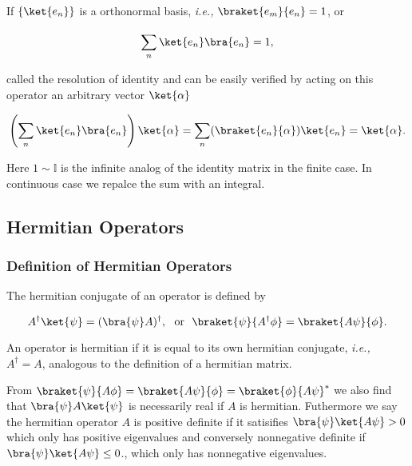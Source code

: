 \documentclass[a4paper,12pt]{report}
\begin{document}
If \(\{\ket{e_{n} }\} \) is a orthonormal basis, \textit{i.e.,} \(\braket{e_{m} }{e_{n} } = 1\), or 

\begin{equation}
  \sum_{n}^{} \ket{e_{n} }\bra{e_{n} } = 1,   
\end{equation}

called the resolution of identity and can be easily verified by acting on this operator an arbitrary vector \(\ket{\alpha } \)

\begin{equation}
  \left( \sum_{n}^{} \ket{e_{n} }\bra{e_{n} } \right) \ket{\alpha } = \sum_{n}^{} (\braket{e_{n} }{\alpha } )\ket{e_{n} } = \ket{\alpha }.   
\end{equation}

Here \(1 \sim  \mathbb{I}\) is the infinite analog of the identity matrix in the finite case. In continuous case we repalce the sum with an integral.





\subsection{Hermitian Operators}

\subsubsection{Definition of Hermitian Operators}

The hermitian conjugate of an operator is defined by 

\begin{equation}
  A^{\dagger} \ket{\psi } = (\bra{\psi }A )^{\dagger}, ~\text { or }~ \braket{\psi }{A^{\dagger} \phi } = \braket{A \psi }{\phi }. \label{herm2} 
\end{equation}

An operator is hermitian if it is equal to its own hermitian conjugate, \textit{i.e.,} \(A^{\dagger} = A\), analogous to the definition of a hermitian matrix. 

From \(\braket{\psi }{A\phi } = \braket{A\psi }{\phi } = \braket{\phi }{A\psi }^*   \) we also find that \(\bra{\psi }A\ket{\psi }  \) is necessarily real if \(A\) is hermitian. Futhermore we say the hermitian operator \(A\) is positive definite if it satisifies \(\bra{\psi }\ket{A\psi } >0  \) which only has positive eigenvalues and conversely nonnegative definite if \(\bra{\psi }\ket{A\psi } \le 0  \)., which only has nonnegative eigenvalues.     
\end{document}
